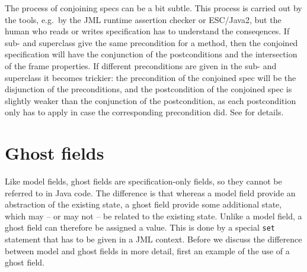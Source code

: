 \documentclass{llncs}
\begin{document}
The process of conjoining specs can be a bit subtle. This process is carried 
out by the tools, e.g.\ by the JML runtime assertion checker or ESC/Java2, 
but the human who reads or writes specification has to understand the 
conseqences.  If sub- and superclass
give the same precondition for a method, then the conjoined specification will
have the conjunction of the postconditions and the intersection of the frame
properties.  If different preconditions are given in the sub- and superclass it
becomes trickier: the precondition of the conjoined spec will be the
disjunction of the preconditions, and the postcondition of the conjoined spec
is slightly weaker than the conjunction of the postcondition, as each
postcondition only has to apply in case the corresponding precondition did.
See \cite{Dhara-Leavens96} for details.


% 



\section{Ghost fields}
\label{Sec:ghost}


Like model fields, ghost fields are specification-only fields,
so they cannot be referred to in Java code.
The difference is that whereas a model field provide an abstraction
of the existing state, a ghost field provide some additional state,
which may -- or may not -- be related to the existing state.
Unlike a model field, a ghost field can therefore
be assigned a value. This is done by a special \texttt{set} statement
that has to be given in a JML context.
Before we discuss the difference between model and ghost fields
in more detail, first an example of the use of a ghost field.
\end{document}
